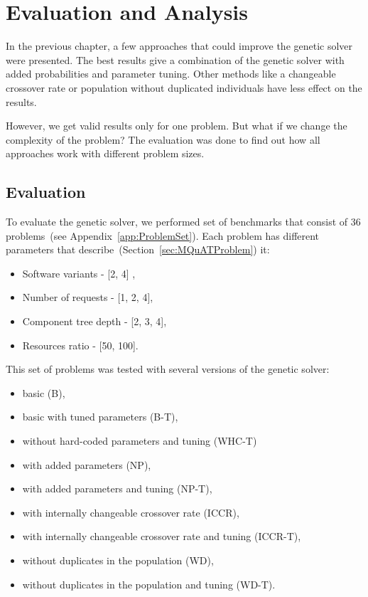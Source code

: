 \chapter{Evaluation and Analysis}

In the previous chapter, a few approaches that could improve the genetic solver were presented.
The best results give a combination of the genetic solver with added probabilities and parameter tuning.
Other methods like a changeable crossover rate or population without duplicated individuals have less effect on the results.

However, we get valid results only for one problem. But what if we change the complexity of the problem? The evaluation was done to find out how all approaches work with different problem sizes. 

\section{Evaluation}
\label{sec:evaluation}

To evaluate the genetic solver, we performed set of benchmarks that consist of 36 problems~(see Appendix~\ref{app:ProblemSet}). Each problem has different parameters that describe~(Section~\ref{sec:MQuATProblem}) it:

\begin{itemize}
	\item Software variants - [2, 4] ,
	\item Number of requests - [1, 2, 4],
	\item Component tree depth - [2, 3, 4],
	\item  Resources ratio - [50, 100].
\end{itemize}

This set of problems was tested with several versions of the genetic solver:

\begin{itemize}
	\item basic (B),
	\item basic with tuned parameters (B-T),
	\item without hard-coded parameters and tuning (WHC-T) 
	\item with added parameters (NP),
	\item with added parameters and tuning (NP-T),
	\item with internally changeable crossover rate (ICCR),
	\item with internally changeable crossover rate and tuning (ICCR-T),
	\item without duplicates in the population (WD),
	\item without duplicates in the population and tuning (WD-T).
\end{itemize}

